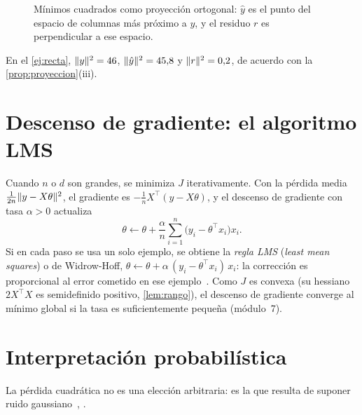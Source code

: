 \begin{figure}[h]
\centering
{}
\caption{Mínimos cuadrados como proyección ortogonal: $\hat y$ es el punto del espacio de columnas más próximo a $y$, y el residuo $r$ es perpendicular a ese espacio.}
\label{fig:proyeccion}
\end{figure}

En el \cref{ej:recta}, $\lVert y\rVert^{2}=46$, $\lVert\hat y\rVert^{2}=45{,}8$ y $\lVert r\rVert^{2}=0{,}2$, de acuerdo con la \cref{prop:proyeccion}(iii).

\section{Descenso de gradiente: el algoritmo LMS}
\label{sec:lms}

Cuando $n$ o $d$ son grandes, se minimiza $J$ iterativamente. Con la pérdida media $\frac{1}{2n}\lVert y-X\theta\rVert^{2}$, el gradiente es $-\frac1n X^{\top}(y-X\theta)$, y el descenso de gradiente con tasa $\alpha>0$ actualiza
\[
\theta\leftarrow\theta+\frac{\alpha}{n}\sum_{i=1}^{n}\bigl(y_i-\theta^{\top}x_i\bigr)x_i.
\]
Si en cada paso se usa un solo ejemplo, se obtiene la \emph{regla LMS} (\emph{least mean squares}) o de Widrow-Hoff, $\theta\leftarrow\theta+\alpha\,(y_i-\theta^{\top}x_i)\,x_i$: la corrección es proporcional al error cometido en ese ejemplo~\cite[§1.1]{cs229}. Como $J$ es convexa (su hessiano $2X^{\top}X$ es semidefinido positivo, \cref{lem:rango}), el descenso de gradiente converge al mínimo global si la tasa es suficientemente pequeña (módulo~7).

\section{Interpretación probabilística}

La pérdida cuadrática no es una elección arbitraria: es la que resulta de suponer ruido gaussiano~\cite[§1.3]{cs229}, \cite[§3.1.1]{bishop}.

